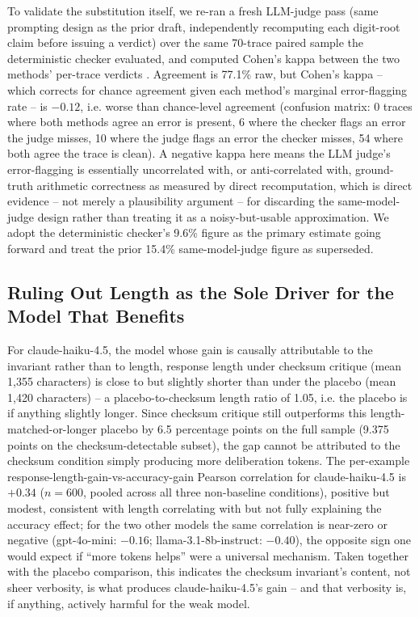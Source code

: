 \documentclass[11pt,letterpaper]{article}
\begin{document}
To validate the substitution itself, we re-ran a fresh LLM-judge pass (same prompting design as the prior draft, independently recomputing each digit-root claim before issuing a verdict) over the same 70-trace paired sample the deterministic checker evaluated, and computed Cohen's kappa between the two methods' per-trace verdicts \citep{Cohen1960}. Agreement is 77.1\% raw, but Cohen's kappa -- which corrects for chance agreement given each method's marginal error-flagging rate -- is $-0.12$, i.e. worse than chance-level agreement (confusion matrix: 0 traces where both methods agree an error is present, 6 where the checker flags an error the judge misses, 10 where the judge flags an error the checker misses, 54 where both agree the trace is clean). A negative kappa here means the LLM judge's error-flagging is essentially uncorrelated with, or anti-correlated with, ground-truth arithmetic correctness as measured by direct recomputation, which is direct evidence -- not merely a plausibility argument -- for discarding the same-model-judge design rather than treating it as a noisy-but-usable approximation. We adopt the deterministic checker's 9.6\% figure as the primary estimate going forward and treat the prior 15.4\% same-model-judge figure as superseded.

\subsection{Ruling Out Length as the Sole Driver for the Model That Benefits}

For claude-haiku-4.5, the model whose gain is causally attributable to the invariant rather than to length, response length under checksum critique (mean 1,355 characters) is close to but slightly shorter than under the placebo (mean 1,420 characters) -- a placebo-to-checksum length ratio of 1.05, i.e. the placebo is if anything slightly longer. Since checksum critique still outperforms this length-matched-or-longer placebo by 6.5 percentage points on the full sample (9.375 points on the checksum-detectable subset), the gap cannot be attributed to the checksum condition simply producing more deliberation tokens. The per-example response-length-gain-vs-accuracy-gain Pearson correlation for claude-haiku-4.5 is $+0.34$ ($n=600$, pooled across all three non-baseline conditions), positive but modest, consistent with length correlating with but not fully explaining the accuracy effect; for the two other models the same correlation is near-zero or negative (gpt-4o-mini: $-0.16$; llama-3.1-8b-instruct: $-0.40$), the opposite sign one would expect if ``more tokens helps'' were a universal mechanism. Taken together with the placebo comparison, this indicates the checksum invariant's content, not sheer verbosity, is what produces claude-haiku-4.5's gain -- and that verbosity is, if anything, actively harmful for the weak model.
\end{document}
